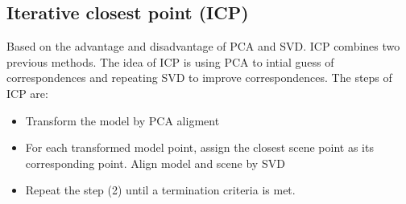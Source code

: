 \subsection{Iterative closest point (ICP)}
Based on the advantage and disadvantage of PCA and SVD. ICP combines two previous methods. The idea of ICP is using PCA to intial guess of correspondences and repeating SVD to improve correspondences. The steps of ICP are:
\begin{itemize}
	\item Transform the model by PCA aligment
	\item For each transformed model point, assign the closest scene point as its corresponding point. Align model and scene by SVD
	\item Repeat the step (2) until a termination criteria is met.
\end{itemize}
